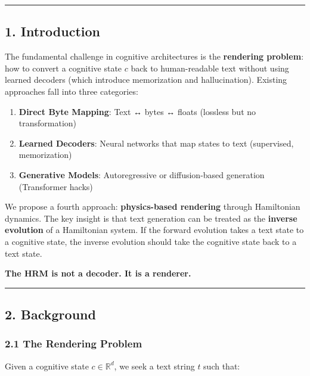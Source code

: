 \documentclass[
  11pt,
  a4paper,
]{article}
\providecommand{\tightlist}{%
  \setlength{\itemsep}{0pt}\setlength{\parskip}{0pt}}
\begin{document}
\begin{center}\rule{0.5\linewidth}{0.5pt}\end{center}

\subsection{1. Introduction}\label{introduction}

The fundamental challenge in cognitive architectures is the
\textbf{rendering problem}: how to convert a cognitive state \(c\) back
to human-readable text without using learned decoders (which introduce
memorization and hallucination). Existing approaches fall into three
categories:

\begin{enumerate}
\def\labelenumi{\arabic{enumi}.}
\tightlist
\item
  \textbf{Direct Byte Mapping}: Text ↔ bytes ↔ floats (lossless but no
  transformation)
\item
  \textbf{Learned Decoders}: Neural networks that map states to text
  (supervised, memorization)
\item
  \textbf{Generative Models}: Autoregressive or diffusion-based
  generation (Transformer hacks)
\end{enumerate}

We propose a fourth approach: \textbf{physics-based rendering} through
Hamiltonian dynamics. The key insight is that text generation can be
treated as the \textbf{inverse evolution} of a Hamiltonian system. If
the forward evolution takes a text state to a cognitive state, the
inverse evolution should take the cognitive state back to a text state.

\textbf{The HRM is not a decoder. It is a renderer.}

\begin{center}\rule{0.5\linewidth}{0.5pt}\end{center}

\subsection{2. Background}\label{background}

\subsubsection{2.1 The Rendering Problem}\label{the-rendering-problem}

Given a cognitive state \(c \in \mathbb{R}^d\), we seek a text string
\(t\) such that:
\end{document}

